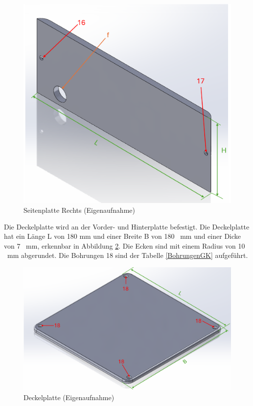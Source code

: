 \begin{figure}[H]
	\begin{center}
		\includegraphics[width=\textwidth]{Images/Konstruktion/SeiteRK.png}
		\caption{Seitenplatte Rechts (Eigenaufnahme)} \label{SeiteRK}
	\end{center}
\end{figure}

Die Deckelplatte wird an der Vorder- und Hinterplatte befestigt. Die Deckelplatte hat ein Länge L von 180 mm und einer Breite B von 180 \ mm und einer Dicke von 7 \ mm, erkennbar in Abbildung \ref{DeckelK}. Die Ecken sind mit einem Radius von 10 \ mm abgerundet. Die Bohrungen 18 sind der Tabelle \ref{BohrungenGK} aufgeführt.

\begin{figure}[H]
	\begin{center}
		\includegraphics[width=\textwidth]{Images/Konstruktion/DeckelK.png}
		\caption{Deckelplatte (Eigenaufnahme)} \label{DeckelK}
	\end{center}
\end{figure}


